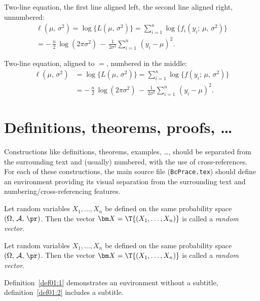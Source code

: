Two-line equation, the first line aligned left, the second line
aligned right, unnumbered:
\begin{multline*}
\ell(\mu,\,\sigma^2) = \log\bigl\{L(\mu,\,\sigma^2)\bigr\} = 
\sum_{i=1}^n \log\bigl\{f_i(y_i;\,\mu,\,\sigma^2)\bigr\} \\
  = -\,\frac{n}{2}\,\log(2\pi\sigma^2) \,-\, 
\frac{1}{2\sigma^2}\sum_{i=1}^n\,(y_i - \mu)^2. 
\end{multline*}

Two-line equation, aligned to $=$, numbered in the middle:
\begin{equation}\label{eq01:ell}
\begin{split}
\ell(\mu,\,\sigma^2) &= \log\bigl\{L(\mu,\,\sigma^2)\bigr\} = 
\sum_{i=1}^n \log\bigl\{f(y_i;\,\mu,\,\sigma^2)\bigr\} \\
& = -\,\frac{n}{2}\,\log(2\pi\sigma^2) \,-\, 
\frac{1}{2\sigma^2}\sum_{i=1}^n\,(y_i - \mu)^2. 
\end{split}
\end{equation}


\section{Definitions, theorems, proofs, \dots}

Constructions like definitions, theorems, examples, \dots, should be
separated from the surrounding  text and (usually) numbered, with the
use of cross-references. For each of these constructions, the main
source file (\texttt{BcPrace.tex}) should define an environment
providing its visual separation from the surrounding text and
numbering/cross-referencing features. 

\begin{definice}\label{def01:1}
  Let random variables $X_1,\dots,X_n$ be defined on the same
  probability space $(\Omega,\,\mathcal{A},\,\pr)$. Then the vector
  $\bm X = \T{(X_1,\dots,X_n)}$ is called a \emph{random
    vector}.
\end{definice}

\begin{definice}\label{def01:2}
  Let random variables $X_1,\dots,X_n$ be defined on the same
  probability space $(\Omega,\,\mathcal{A},\,\pr)$. Then the vector
  $\bm X = \T{(X_1,\dots,X_n)}$ is called a \emph{random
    vector}.
\end{definice}
Definition~\ref{def01:1} demonstrates an environment without a
subtitle, definition~\ref{def01:2} includes a subtitle.

